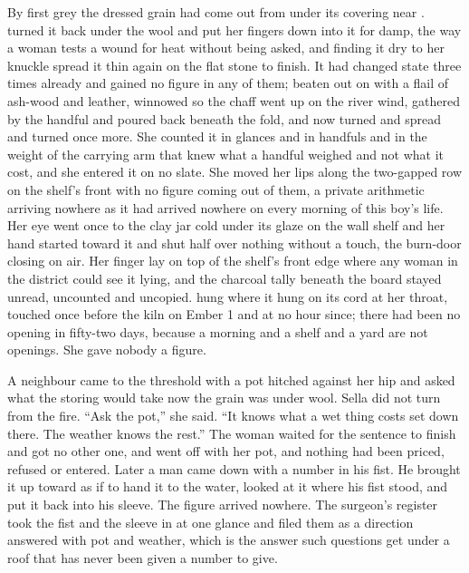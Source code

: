 By first grey the dressed grain had come out from under its covering near .  turned it back under the wool and put her fingers down into it for damp, the way a woman tests a wound for heat without being asked, and finding it dry to her knuckle spread it thin again on the flat stone to finish. It had changed state three times already and gained no figure in any of them; beaten out on  with a flail of ash-wood and leather, winnowed so the chaff went up on the river wind, gathered by the handful and poured back beneath the fold, and now turned and spread and turned once more. She counted it in glances and in handfuls and in the weight of the carrying arm that knew what a handful weighed and not what it cost, and she entered it on no slate. She moved her lips along the two-gapped row on the shelf's front with no figure coming out of them, a private arithmetic arriving nowhere as it had arrived nowhere on every morning of this boy's life. Her eye went once to the clay jar cold under its glaze on the wall shelf and her hand started toward it and shut half over nothing without a touch, the burn-door closing on air. Her finger lay on top of the shelf's front edge where any woman in the district could see it lying, and the charcoal tally beneath the board stayed unread, uncounted and uncopied.  hung where it hung on its cord at her throat, touched once before the kiln on Ember 1 and at no hour since; there had been no opening in fifty-two days, because a morning and a shelf and a yard are not openings. She gave nobody a figure.

A neighbour came to the threshold with a pot hitched against her hip and asked what the storing would take now the grain was under wool. Sella did not turn from the fire. “Ask the pot,” she said. “It knows what a wet thing costs set down there. The weather knows the rest.” The woman waited for the sentence to finish and got no other one, and went off with her pot, and nothing had been priced, refused or entered. Later a man came down  with a number in his fist. He brought it up toward  as if to hand it to the water, looked at it where his fist stood, and put it back into his sleeve. The figure arrived nowhere. The surgeon's register took the fist and the sleeve in at one glance and filed them as a direction answered with pot and weather, which is the answer such questions get under a roof that has never been given a number to give.

